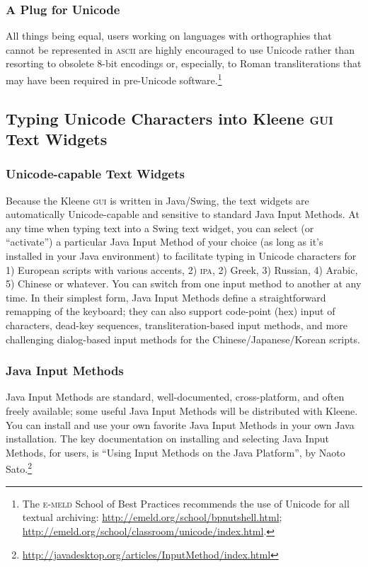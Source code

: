 \documentclass[letterpaper,12pt]{article}
\newcommand{\acro}{\textsc}
\begin{document}
\subsubsection{A Plug for Unicode}

All things being equal, users working on languages with orthographies
that cannot be represented in \acro{ascii} are highly encouraged to use
Unicode rather than resorting to obsolete 8-bit encodings or, especially,
to Roman transliterations that may have been required in pre-Unicode
software.\footnote{The \acro{e-meld} School of Best Practices recommends
the use of Unicode for all textual archiving:
\url{http://emeld.org/school/bpnutshell.html};
\url{http://emeld.org/school/classroom/unicode/index.html}.}

\subsection{Typing Unicode Characters into Kleene \acro{gui} Text Widgets}

\subsubsection{Unicode-capable Text Widgets}

Because the Kleene \acro{gui} is written in Java/Swing, the text widgets
are automatically Unicode-capable and sensitive to standard Java Input
Methods.  At any time when typing text into a Swing text widget, you can
select (or ``activate'') a particular Java Input Method of your choice
(as long as it's installed in your Java environment) to facilitate typing
in Unicode characters for 1) European scripts with various accents, 2)
\acro{ipa}, 2) Greek, 3) Russian, 4) Arabic, 5) Chinese or whatever.  You
can switch from one input method to another at any time.  In their
simplest form, Java Input Methods define a straightforward remapping of
the keyboard; they can also support code-point (hex) input of characters,
dead-key sequences, transliteration-based input methods, and more
challenging dialog-based input methods for the Chinese/Japanese/Korean
scripts.

\subsubsection{Java Input Methods}

Java Input Methods are standard, well-documented, cross-platform, and
often freely available; some useful Java Input Methods will be
distributed with Kleene.  You can install and use your own favorite Java
Input Methods in your own Java installation.  The key documentation on
installing and selecting Java Input Methods, for users, is ``Using Input
Methods on the Java Platform'', by Naoto
Sato.\footnote{\url{http://javadesktop.org/articles/InputMethod/index.html}}
\end{document}
